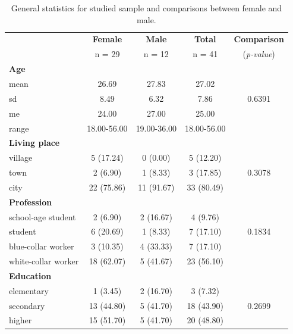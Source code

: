 \documentclass[12pt,a4paper,notitlepage]{report}
\begin{document}
\begin{table}[H]
\centering
	\begin{tabular}{lcccc}
	\hline 		 				& \textbf{Female} & \textbf{Male} & \textbf{Total} &  \textbf{Comparison} \\
	 		 					& n = 29 		& n = 12		& n = 41		&  (\textit{p-value}) \\
	\hline
	\hline
	\bf{Age}						&			&			&			&		\\
	\indent mean					& 26.69		& 27.83		& 27.02		& 		\\
	\indent sd					& 8.49		& 6.32		& 7.86		& 0.6391 \\
	\indent me					& 24.00		& 27.00		& 25.00		& 		\\
	\indent range				& 18.00-56.00 & 19.00-36.00	& 18.00-56.00	& \\
	\hline
	
	\bf{Living place} 				&			&			&			&		\\
	\indent village				& 5 (17.24)	& 0 (0.00)	& 5	(12.20)	& 		\\
	\indent town					& 2 (6.90)	& 1	(8.33) 	& 3	(17.85) 	&  0.3078 \\
	\indent city					& 22 (75.86)	& 11 (91.67) & 33 (80.49) & 		\\
	\hline
	
	\bf{Profession} 				&			&			&			&		\\
	\indent school-age student		& 2 (6.90)	& 2 (16.67)	& 4	(9.76) 	& 		\\
	\indent student				& 6 (20.69)	& 1	(8.33) 	& 7	(17.10) 	& 0.1834 \\
	\indent blue-collar worker		& 3 (10.35)	& 4 (33.33) 	& 7 (17.10) 	& 		\\
	\indent white-collar worker	& 18 (62.07)	& 5 (41.67) 	& 23 (56.10)	 & 		\\
	\hline
	
	\bf{Education} 				&			&			&			&		\\
	\indent elementary			& 1 (3.45)	& 2 (16.70)	& 3	(7.32) 	& 		\\
	\indent secondary			& 13 (44.80)	& 5	(41.70) 	& 18 (43.90) 	& 0.2699 \\
	\indent higher				& 15 (51.70)	& 5 (41.70) 	& 20 (48.80) 	& 		\\
	\hline
	
	\end{tabular} \\ 
	\caption{General statistics for studied sample and comparisons between female and male.}
	\label{tab:General_stats}
\end{table}
\end{document}
